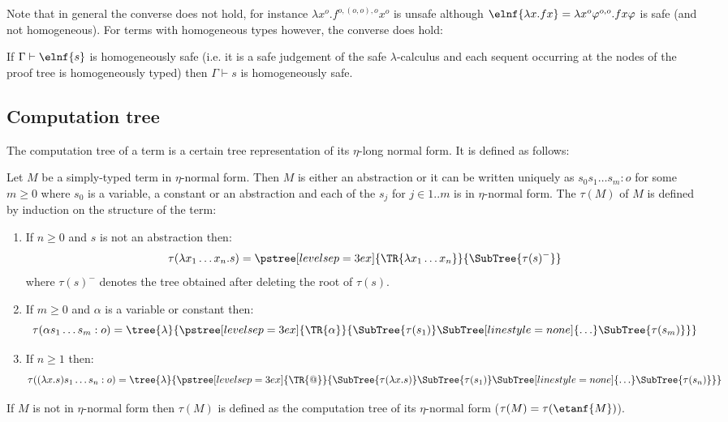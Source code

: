 Note that in general the converse does not hold, for instance $\lambda x^o . f^{o,(o,o),o} x^o$ is unsafe although $\elnf{\lambda x . f x} = \lambda x^o \varphi^{o,o} . f x \varphi$ is safe (and not homogeneous). For terms with homogeneous types however, the converse does hold:
\begin{lemma}
If $\Gamma \vdash \elnf{s}$ is homogeneously safe (i.e. it is a safe judgement of the safe $\lambda$-calculus and each sequent occurring at the nodes of the proof tree is homogeneously typed) then
$\Gamma \vdash s$ is homogeneously safe.
\end{lemma}


\subsection{Computation tree}
The computation tree of a term is a certain tree representation of its
$\eta$-long normal form. It is defined as follows:

\begin{definition}
\label{dfn:comptree} Let $M$ be a simply-typed term in $\eta$-normal
form. Then $M$ is either an abstraction or it can be written
uniquely as $s_0 s_1 \ldots s_m : o$ for some $m\geq0$ where $s_0$
is a variable, a constant or an abstraction and each of the $s_j$
for $j\in 1..m$ is in $\eta$-normal form. The
 $\tau(M)$ of $M$ is defined by induction
on the structure of the term:
\begin{enumerate}[-]
\item If $n\geq0$ and $s$ is not an abstraction then:
$$ \tau(\lambda x_1 \ldots x_n . s) =
      \pstree[levelsep=3ex]
        { \TR{\lambda x_1 \ldots x_n} }
        { \SubTree{\tau(s)^{-}} }
$$
where $\tau(s)^{-}$ denotes the tree obtained after deleting the root of $\tau(s)$.

\item If $m\geq0$ and $\alpha$ is a variable or constant then:
$$ \tau( \alpha s_1 \ldots s_m : o) =
    \tree{\lambda}
    {
        \pstree[levelsep=3ex]
            { \TR{\alpha} }
            { \SubTree{\tau(s_1)} \SubTree[linestyle=none]{\ldots} \SubTree{\tau(s_m)}
            }
    }
$$

\item If $n \geq 1$ then:
$$ \tau((\lambda x.s) s_1 \ldots s_n : o) =
    \tree{\lambda}
    {
        \pstree[levelsep=3ex]
            { \TR{@} }
            {
            \SubTree{\tau(\lambda x.s)}    \SubTree{\tau(s_1)} \SubTree[linestyle=none]{\ldots} \SubTree{\tau(s_n)}
            }
    }
$$
\end{enumerate}

If $M$ is not in $\eta$-normal form then $\tau(M)$ is defined as the
computation tree of its $\eta$-normal form ($\tau(M) =
\tau(\etanf{M})$).
\end{definition}

